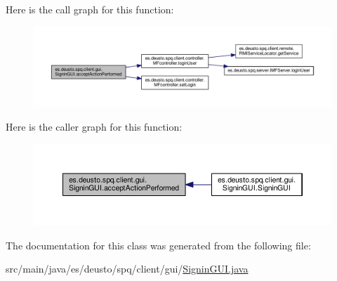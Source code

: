 Here is the call graph for this function\+:\nopagebreak
\begin{figure}[H]
\begin{center}
\leavevmode
\includegraphics[width=350pt]{classes_1_1deusto_1_1spq_1_1client_1_1gui_1_1_signin_g_u_i_af8a81c0d5cf82607229d9ccb32f597fc_cgraph}
\end{center}
\end{figure}




Here is the caller graph for this function\+:\nopagebreak
\begin{figure}[H]
\begin{center}
\leavevmode
\includegraphics[width=350pt]{classes_1_1deusto_1_1spq_1_1client_1_1gui_1_1_signin_g_u_i_af8a81c0d5cf82607229d9ccb32f597fc_icgraph}
\end{center}
\end{figure}




The documentation for this class was generated from the following file\+:\begin{DoxyCompactItemize}
\item 
src/main/java/es/deusto/spq/client/gui/\hyperlink{_signin_g_u_i_8java}{Signin\+G\+U\+I.\+java}\end{DoxyCompactItemize}
